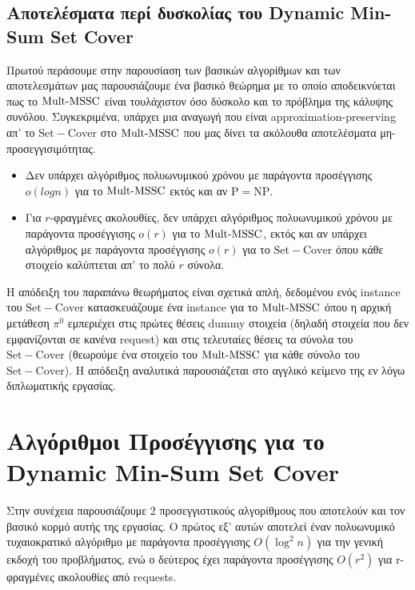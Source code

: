 \subsection{Αποτελέσματα περί δυσκολίας του Dynamic Min-Sum Set Cover}\label{s:main}
\noindent Πρωτού περάσουμε στην παρουσίαση των βασικών αλγορίθμων και των αποτελεσμάτων μας παρουσιάζουμε ένα βασικό θεώρημα με το οποίο αποδεικνύεται πως το $\mathrm{Mult}\text{-}\mathrm{MSSC}$ είναι τουλάχιστον όσο δύσκολο και το πρόβλημα της κάλυψης συνόλου. Συγκεκριμένα, υπάρχει μια αναγωγή που είναι
approximation-preserving απ' το $\mathrm{Set-Cover}$ στο  
$\mathrm{Mult}\text{-}\mathrm{MSSC}$ που μας δίνει τα ακόλουθα αποτελέσματα μη-προσεγγισιμότητας.

\begin{θεώρημα}\label{t:hardness}
\begin{itemize}
    \item Δεν υπάρχει αλγόριθμος πολυωνυμικού χρόνου με παράγοντα προσέγγισης $o(logn)$ για το $\mathrm{Mult}\text{-}\mathrm{MSSC}$ εκτός και αν $\mathrm{P = NP}$.
    
    \item Για $r$-φραγμένες ακολουθίες, δεν υπάρχει αλγόριθμος πολυωνυμικού χρόνου με παράγοντα προσέγγισης $o(r)$ για το $\mathrm{Mult}\text{-}\mathrm{MSSC}$, εκτός και αν υπάρχει αλγόριθμος με παράγοντα προσέγγισης
    $o(r)$ για το $\mathrm{Set-Cover}$ όπου κάθε στοιχείο καλύπτεται απ' το πολύ $r$ σύνολα.
\end{itemize}
\end{θεώρημα}

\noindent Η απόδειξη του παραπάνω θεωρήματος είναι σχετικά απλή, δεδομένου ενός instance του $\mathrm{Set-Cover}$ κατασκευάζουμε ένα instance για το $\mathrm{Mult}\text{-}\mathrm{MSSC}$ όπου η αρχική μετάθεση $\pi^0$ εμπεριέχει στις πρώτες θέσεις dummy στοιχεία (δηλαδή στοιχεία που δεν εμφανίζονται σε κανένα request) και στις τελευταίες θέσεις τα σύνολα του $\mathrm{Set-Cover}$ (θεωρούμε ένα στοιχείο του $\mathrm{Mult}\text{-}\mathrm{MSSC}$ για κάθε σύνολο του $\mathrm{Set-Cover}$). Η απόδειξη αναλυτικά παρουσιάζεται στο αγγλικό κείμενο της εν λόγω διπλωματικής εργασίας.

\section{Αλγόριθμοι Προσέγγισης για το Dynamic Min-Sum Set Cover}

Στην συνέχεια παρουσιάζουμε 2 προσεγγιστικούς αλγορίθμους που αποτελούν και τον βασικό κορμό αυτής της εργασίας. Ο πρώτος εξ' αυτών αποτελεί έναν πολυωνυμικό τυχαιοκρατικό αλγόριθμο με παράγοντα προσέγγισης $O(\log^2 n)$ για την γενική εκδοχή του προβλήματος, ενώ ο δεύτερος έχει παράγοντα προσέγγισης $O(r^2 )$  για r-φραγμένες ακολουθίες από requests. \\


